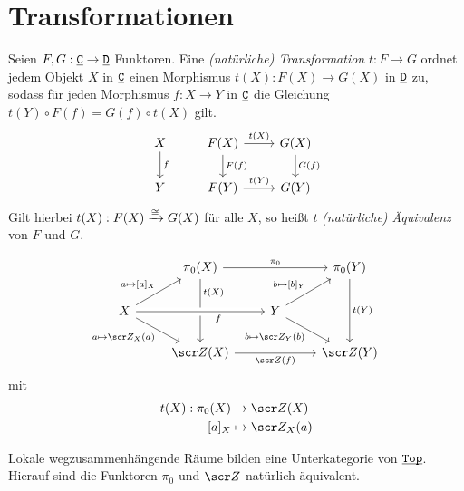 \section{Transformationen}


\begin{df}
	Seien $F, G: \underline{\smash{\mathtt{C}}} \to \underline{\smash{\mathtt{D}}}$ Funktoren.
	Eine \emph{(natürliche) Transformation} $t: F \to G$ ordnet jedem Objekt $X$ in $\underline{\smash{\mathtt{C}}}$ einen Morphismus $t(X): F(X) \to G(X)$ in $\underline{\smash{\mathtt{D}}}$ zu, sodass für jeden Morphismus $f: X \to Y$ in $\underline{\smash{\mathtt{C}}}$ die Gleichung $t(Y) \circ F(f) = G(f) \circ t(X)$ gilt.
	\[
		\begin{tikzcd}
			X \arrow{d}{f} & F(X) \arrow{d}{F(f)} \arrow{r}{t(X)} & G(X) \arrow{d}{G(f)} \\
			Y & F(Y) \arrow{r}{t(Y)} & G(Y)
		\end{tikzcd}
	\]
	Gilt hierbei $t(X) : F(X) \xrightarrow{\cong} G(X)$ für alle $X$, so heißt $t$ \emph{(natürliche) Äquivalenz} von $F$ und $G$.
\end{df}

\begin{ex}
	\[
		\begin{tikzcd}
			~ & \pi_0(X) \arrow{dd}[yshift=5mm]{t(X)} \arrow{rr}{\pi_0} & & \pi_0(Y) \arrow{dd}{t(Y)} \\
			X \arrow{ur}{a\mapsto [a]_X} \arrow{dr}[swap]{a\mapsto \scr Z_X(a)} \arrow[crossing over]{rr}[swap,xshift=5mm]{f} & & Y \arrow{ru}{b\mapsto[b]_Y} \arrow{dr}[swap]{b\mapsto \scr Z_Y(b)} & \\
			& \scr Z(X) \arrow{rr}[below]{\scr Z(f)} && \scr Z(Y)
		\end{tikzcd}
	\]
	mit
	\begin{align*}
		t(X): \pi_0(X) &\to \scr Z(X) \\
		[a]_X &\mapsto \scr Z_X(a)
	\end{align*}
	\begin{note}
		Lokale wegzusammenhängende Räume bilden eine Unterkategorie von $\underline{\smash{\mathtt{Top}}}$.
		Hierauf sind die Funktoren $\pi_0$ und $\scr Z$ natürlich äquivalent.
	\end{note}
\end{ex}



